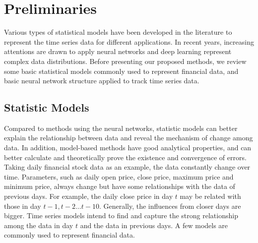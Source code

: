 \section{Preliminaries}

Various types of statistical models\cite{aamir2016modelling}\cite{gupta2019very}\cite{shbier2017swgarch}\cite{zhu2020high} have been developed in the literature to represent the time series data for different applications. In recent years, increasing attentions are drawn to apply neural networks and deep learning\cite{kashiparekh2019convtimenet}\cite{sangiorgio2020robustness}\cite{hewamalage2020recurrent} \cite{zhu2021news}\cite{zhu2020adaptive} represent complex data distributions. Before presenting our proposed methods, we review some basic statistical models commonly used to represent financial data, and basic neural network structure applied to track time series data. 

\subsection{Statistic Models}
Compared to methods using the neural networks, statistic models can better explain the relationship between data and reveal the mechanism of change among data. In addition, model-based methods have good analytical properties, and can better calculate and theoretically prove the existence and convergence of errors. Taking daily financial stock data as an example, the data constantly change over time. Parameters, such as daily open price, close price, maximum price and minimum price, always change but have some relationships with the data of previous days. For example, the daily close price in day $t$ may be related with those in day $t-1, t-2…t-10$. Generally, the influences from closer days are bigger.  Time series models intend to find and capture the strong relationship among the data in day $t$ and the data in previous days. A few models are commonly used to represent financial data. 
